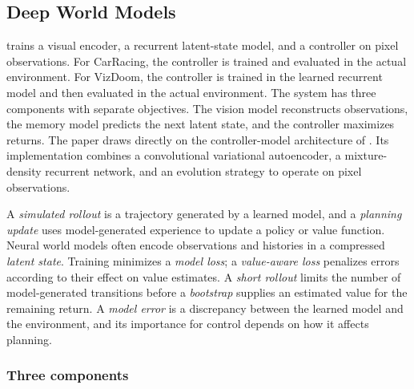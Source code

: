 \subsection{Deep World Models}
\label{section:fc_ha_schmidhuber}

\citet{HaSchmidhuber2018} trains a visual encoder, a recurrent latent-state model, and a controller on pixel observations. For CarRacing, the controller is trained and evaluated in the actual environment. For VizDoom, the controller is trained in the learned recurrent model and then evaluated in the actual environment. The system has three components with separate objectives. The vision model reconstructs observations, the memory model predicts the next latent state, and the controller maximizes returns. The paper draws directly on the controller-model architecture of \citet{Schmidhuber1990}. Its implementation combines a convolutional variational autoencoder, a mixture-density recurrent network, and an evolution strategy to operate on pixel observations.

A \emph{simulated rollout} is a trajectory generated by a learned model, and a \emph{planning update} uses model-generated experience to update a policy or value function. Neural world models often encode observations and histories in a compressed \emph{latent state}. Training minimizes a \emph{model loss}; a \emph{value-aware loss} penalizes errors according to their effect on value estimates. A \emph{short rollout} limits the number of model-generated transitions before a \emph{bootstrap} supplies an estimated value for the remaining return. A \emph{model error} is a discrepancy between the learned model and the environment, and its importance for control depends on how it affects planning.

\subsubsection{Three components}
\label{section:fc_ha_schmidhuber_components}

